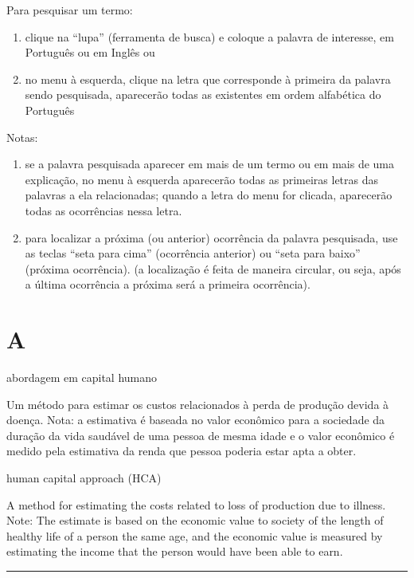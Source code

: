 \documentclass[
]{book}
\begin{document}
Para pesquisar um termo:

\begin{enumerate}
\def\labelenumi{\alph{enumi})}
\item
  clique na ``lupa'' (ferramenta de busca) e coloque a palavra de interesse, em Português ou em Inglês ou
\item
  no menu à esquerda, clique na letra que corresponde à primeira da palavra sendo pesquisada, aparecerão todas as existentes em ordem alfabética do Português
\end{enumerate}

Notas:

\begin{enumerate}
\def\labelenumi{\arabic{enumi})}
\item
  se a palavra pesquisada aparecer em mais de um termo ou em mais de uma explicação, no menu à esquerda aparecerão todas as primeiras letras das palavras
  a ela relacionadas; quando a letra do menu for clicada, aparecerão todas as ocorrências nessa letra.
\item
  para localizar a próxima (ou anterior) ocorrência da palavra pesquisada, use as teclas ``seta para cima'' (ocorrência anterior) ou ``seta para baixo'' (próxima ocorrência). (a localização é feita de maneira circular, ou seja, após a última ocorrência a próxima será a primeira ocorrência).
\end{enumerate}

\hypertarget{a}{%
\chapter*{A}\label{a}}

abordagem em capital humano

Um método para estimar os custos relacionados à perda de produção devida à doença. Nota: a estimativa é baseada no valor econômico para a sociedade da duração da vida saudável de uma pessoa de mesma idade e o valor econômico é medido pela estimativa da renda que pessoa poderia estar apta a obter.

human capital approach (HCA)

A method for estimating the costs related to loss of production due to illness. Note: The estimate is based on the economic value to society of the length of healthy life of a person the same age, and the economic value is measured by estimating the income that the person would have been able to earn.

\begin{center}\rule{0.5\linewidth}{0.5pt}\end{center}
\end{document}
